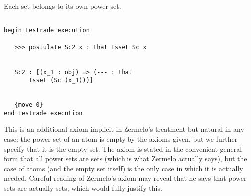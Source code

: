 \documentclass[12pt]{article}
\begin{document}
Each set belongs to its own power set.

\begin{verbatim}

begin Lestrade execution

   >>> postulate Sc2 x : that Isset Sc x


   Sc2 : [(x_1 : obj) => (--- : that 
       Isset (Sc (x_1)))]


   {move 0}
end Lestrade execution
\end{verbatim}

This is an additional axiom implicit in Zermelo's treatment but natural in any case:  the power set of an atom is empty by the axioms given, but we further
specify that it is the empty set.  The axiom is stated in the convenient general form that all power sets are sets (which is what Zermelo actually says), but the case of atoms (and the empty set itself)
is the only case in which it is actually needed.  Careful reading of Zermelo's axiom may reveal that he says that power sets are actually sets, which would fully justify this.
\end{document}
